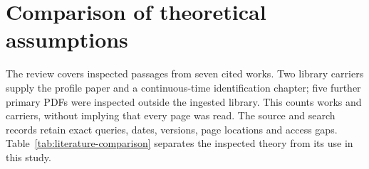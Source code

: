 \documentclass[11pt]{article}
\begin{document}


\section{Comparison of theoretical assumptions}
\label{sec:literature-comparison}
The review covers inspected passages from seven cited works. Two library
carriers supply the profile paper and a continuous-time identification chapter;
five further primary PDFs were inspected outside the ingested library. This
counts works and carriers, without implying that every page was read. The
source and search records retain exact queries, dates, versions, page locations
and access gaps. Table~\ref{tab:literature-comparison} separates the inspected
theory from its use in this study.
\end{document}
